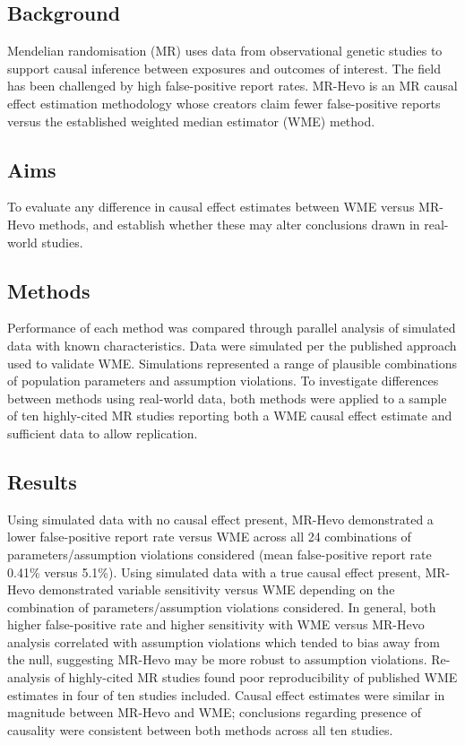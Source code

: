 \documentclass[
]{article}
\begin{document}
\subsection{Background}\label{background}

Mendelian randomisation (MR) uses data from observational genetic studies to support causal inference between exposures and outcomes of interest. The field has been challenged by high false-positive report rates. MR-Hevo is an MR causal effect estimation methodology whose creators claim fewer false-positive reports versus the established weighted median estimator (WME) method.

\subsection{Aims}\label{aims}

To evaluate any difference in causal effect estimates between WME versus MR-Hevo methods, and establish whether these may alter conclusions drawn in real-world studies.

\subsection{Methods}\label{methods}

Performance of each method was compared through parallel analysis of simulated data with known characteristics. Data were simulated per the published approach used to validate WME. Simulations represented a range of plausible combinations of population parameters and assumption violations. To investigate differences between methods using real-world data, both methods were applied to a sample of ten highly-cited MR studies reporting both a WME causal effect estimate and sufficient data to allow replication.

\subsection{Results}\label{results}

Using simulated data with no causal effect present, MR-Hevo demonstrated a lower false-positive report rate versus WME across all 24 combinations of parameters/assumption violations considered (mean false-positive report rate 0.41\% versus 5.1\%). Using simulated data with a true causal effect present, MR-Hevo demonstrated variable sensitivity versus WME depending on the combination of parameters/assumption violations considered. In general, both higher false-positive rate and higher sensitivity with WME versus MR-Hevo analysis correlated with assumption violations which tended to bias away from the null, suggesting MR-Hevo may be more robust to assumption violations. Re-analysis of highly-cited MR studies found poor reproducibility of published WME estimates in four of ten studies included. Causal effect estimates were similar in magnitude between MR-Hevo and WME; conclusions regarding presence of causality were consistent between both methods across all ten studies.
\end{document}
